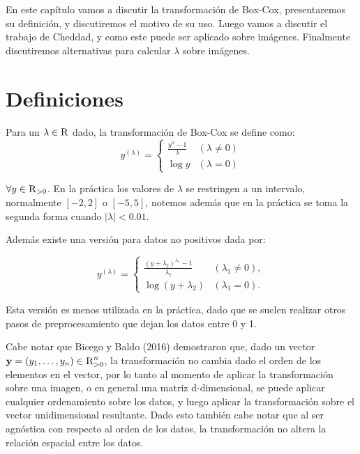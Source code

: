     En este cap\'itulo vamos a discutir la transformaci\'on de Box-Cox, presentaremos su definici\'on, y discutiremos el motivo de su uso. Luego vamos a discutir el trabajo de Cheddad\cite{boxcoximg}, y como este puede ser aplicado sobre im\'agenes. Finalmente discutiremos alternativas para calcular $\lambda$ sobre im\'agenes.
    
    \section{Definiciones}
    Para un $\lambda\in\textsc{R}$ dado, la transformaci\'on de Box-Cox se define como:
    \begin{equation}\label{Box-Cox}
        y^{(\lambda)}= \begin{cases}\frac{y^{\lambda}-1}{\lambda} & (\lambda \neq 0) \\ \log y & (\lambda=0)\end{cases}
    \end{equation}
    
    $\forall y\in\textsc{R}_{>0}$. En la pr\'actica los valores de $\lambda$ se restringen a un intervalo, normalmente $[-2,2]$ o $[-5,5]$, notemos adem\'as que en la pr\'actica se toma la segunda forma cuando $|\lambda|<0.01$\cite{boxcoximg}.
    
    Adem\'as existe una versi\'on para datos no positivos dada por:

    $$
    y^{(\lambda)}= \begin{cases}\frac{\left(y+\lambda_{2}\right)^{\lambda_{1}}-1}{\lambda_{1}} & \left(\lambda_{1} \neq 0\right), \\ \log \left(y+\lambda_{2}\right) & \left(\lambda_{1}=0\right) .\end{cases}
    $$

    Esta versi\'on es menos utilizada en la pr\'actica, dado que se suelen realizar otros pasos de preprocesamiento que dejan los datos entre 0 y 1.
    
    Cabe notar que Bicego y Baldo (2016)\cite{bicego2016} demostraron que, dado un vector $\textbf{y}=(y_1,\dots,y_n)\in\textsc{R}^n_{>0}$, la transformaci\'on no cambia dado el orden de los elementos en el vector, por lo tanto al momento de aplicar la transformaci\'on sobre una imagen, o en general una matriz d-dimensional, se puede aplicar cualquier ordenamiento sobre los datos, y luego aplicar la transformaci\'on sobre el vector unidimensional resultante. Dado esto tambi\'en cabe notar que al ser agn\'ostica con respecto al orden de los datos, la transformaci\'on no altera la relaci\'on espacial entre los datos.
    
